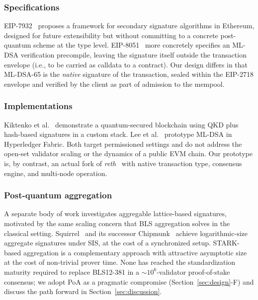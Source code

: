 \documentclass[journal,onecolumn,11pt]{IEEEtran}
\begin{document}
\subsubsection*{Specifications} EIP-7932~\cite{eip7932} proposes a framework for secondary signature algorithms in Ethereum, designed for future extensibility but without committing to a concrete post-quantum scheme at the type level. EIP-8051~\cite{eip8051} more concretely specifies an ML-DSA verification precompile, leaving the signature itself outside the transaction envelope (i.e., to be carried as calldata to a contract). Our design differs in that ML-DSA-65 is the \emph{native} signature of the transaction, sealed within the EIP-2718 envelope and verified by the client as part of admission to the mempool.

\subsubsection*{Implementations} Kiktenko et al.~\cite{kiktenko2018quantumsafe} demonstrate a quantum-secured blockchain using QKD plus hash-based signatures in a custom stack. Lee et al.~\cite{lee2024quantumsafefabric} prototype ML-DSA in Hyperledger Fabric. Both target permissioned settings and do not address the open-set validator scaling or the dynamics of a public EVM chain. Our prototype is, by contrast, an actual fork of \emph{reth}~\cite{reth} with native transaction type, consensus engine, and multi-node operation.

\subsubsection*{Post-quantum aggregation} A separate body of work investigates aggregable lattice-based signatures, motivated by the same scaling concern that BLS aggregation solves in the classical setting. Squirrel~\cite{fleischhacker2022squirrel} and its successor Chipmunk~\cite{fleischhacker2023chipmunk} achieve logarithmic-size aggregate signatures under SIS, at the cost of a synchronized setup. STARK-based aggregation is a complementary approach with attractive asymptotic size at the cost of non-trivial prover time. None has reached the standardization maturity required to replace BLS12-381 in a $\sim 10^6$-validator proof-of-stake consensus; we adopt PoA as a pragmatic compromise (Section~\ref{sec:design}-F) and discuss the path forward in Section~\ref{sec:discussion}.

\end{document}
